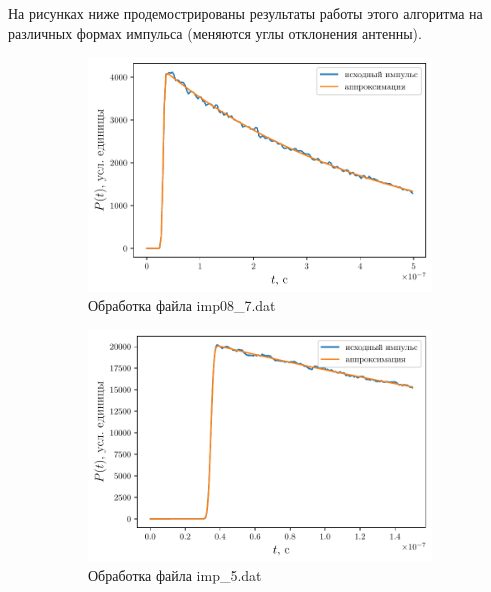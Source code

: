 На рисунках ниже продемострированы результаты работы этого алгоритма на
различных формах импульса (меняются углы отклонения антенны).


\begin{figure}[ht]
    \begin{subfigure}{0.5\linewidth}
        \centering
        \includegraphics[width=\linewidth]{fig/retracking/imp08_7_3}
        \caption{Обработка файла imp08\_7.dat}
        \label{fig:}
    \end{subfigure}
    \begin{subfigure}{0.5\linewidth}
        \centering
        \includegraphics[width=\linewidth]{fig/retracking/imp_5_3}
        \caption{Обработка файла imp\_5.dat}
        \label{fig:}
    \end{subfigure}
    \begin{subfigure}{0.5\linewidth}
        \centering

\end{subfigure}
\end{figure}
